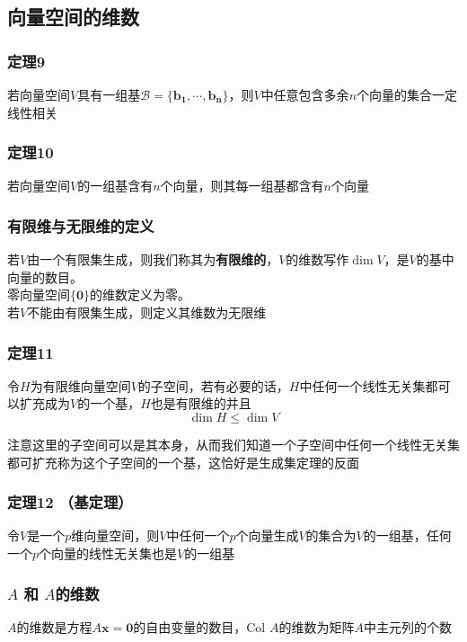 \documentclass{article}
\newcommand{\ve}{\boldsymbol}
\begin{document}
\begin{CJK}{UTF8}{gkai}
\subsection{向量空间的维数}
\subsubsection{定理9}
若向量空间$V$具有一组基$\mathcal{B}=\{\ve{b_1},\cdots,\ve{b_n}\}$，则$V$中任意包含多余$n$个向量的集合一定线性相关\\

\subsubsection{定理10}
若向量空间$V$的一组基含有$n$个向量，则其每一组基都含有$n$个向量\\

\subsubsection{有限维与无限维的定义}
若$V$由一个有限集生成，则我们称其为\textbf{有限维的}，$V$的维数写作$\dim V$，是$V$的基中向量的数目。\\

零向量空间$\{\ve{0}\}$的维数定义为零。\\

若$V$不能由有限集生成，则定义其维数为无限维\\

\subsubsection{定理11}
令$H$为有限维向量空间$V$的子空间，若有必要的话，$H$中任何一个线性无关集都可以扩充成为$V$的一个基，$H$也是有限维的并且
\[\dim H \leq \dim V\]

注意这里的子空间可以是其本身，从而我们知道一个子空间中任何一个线性无关集都可扩充称为这个子空间的一个基，这恰好是生成集定理的反面\\

\subsubsection{定理12 （基定理）}
令$V$是一个$p$维向量空间，则$V$中任何一个$p$个向量生成$V$的集合为$V$的一组基，任何一个$p$个向量的线性无关集也是$V$的一组基\\

\subsubsection{$A$ 和  $A$的维数}
 $A$的维数是方程$A\ve{x} = \ve{0}$的自由变量的数目，Col $A$的维数为矩阵$A$中主元列的个数\\


\end{CJK}
\end{document}
